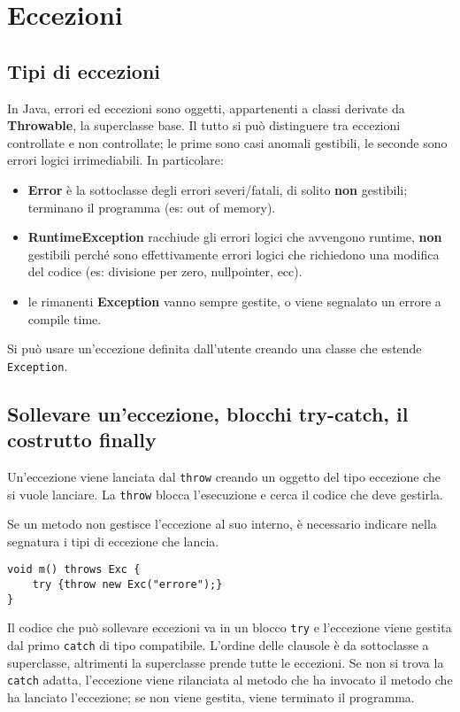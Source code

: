\chapter{Eccezioni}

\section{Tipi di eccezioni}
In Java, errori ed eccezioni sono oggetti, appartenenti a classi derivate da \textbf{Throwable}, la superclasse base. Il tutto si può distinguere tra eccezioni controllate e non controllate; le prime sono casi anomali gestibili, le seconde sono errori logici irrimediabili.
In particolare:
\begin{itemize}
\item \textbf{Error} è la sottoclasse degli errori severi/fatali, di solito \textbf{non} gestibili; terminano il programma (es: out of memory).
\item \textbf{RuntimeException} racchiude gli errori logici che avvengono runtime, \textbf{non} gestibili perché sono effettivamente errori logici che richiedono una modifica del codice (es: divisione per zero, nullpointer, ecc).
\item le rimanenti \textbf{Exception} vanno sempre gestite, o viene segnalato un errore a compile time.
\end{itemize}
Si può usare un'eccezione definita dall'utente creando una classe che estende \texttt{Exception}.

\section{Sollevare un'eccezione, blocchi try-catch, il costrutto finally}
Un'eccezione viene lanciata dal \texttt{throw} creando un oggetto del tipo eccezione che si vuole lanciare. La \texttt{throw} blocca l'esecuzione e cerca il codice che deve gestirla.

Se un metodo non gestisce l'eccezione al suo interno, è necessario indicare nella segnatura i tipi di eccezione che lancia.
\begin{lstlisting}
void m() throws Exc {
    try {throw new Exc("errore");}
}
\end{lstlisting}
Il codice che può sollevare eccezioni va in un blocco \texttt{try} e l'eccezione viene gestita dal primo \texttt{catch} di tipo compatibile. L'ordine delle clausole è da sottoclasse a superclasse, altrimenti la superclasse prende tutte le eccezioni. Se non si trova la \texttt{catch} adatta, l'eccezione viene rilanciata al metodo che ha invocato il metodo che ha lanciato l'eccezione; se non viene gestita, viene terminato il programma.


